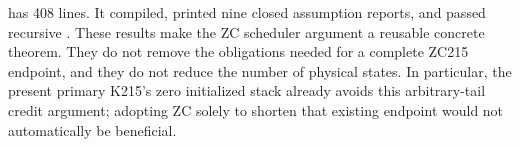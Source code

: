 has 408 lines. It compiled, printed nine closed
assumption reports, and passed recursive . These results
make the ZC scheduler argument a reusable concrete theorem. They do not
remove the obligations needed for a complete ZC215 endpoint, and they do
not reduce the number of physical states. In particular, the present
primary K215's zero initialized stack already avoids this arbitrary-tail
credit argument; adopting ZC solely to shorten that existing endpoint
would not automatically be beneficial.
